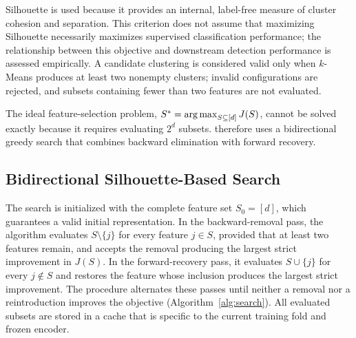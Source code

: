 Silhouette is used because it provides an internal, label-free measure of cluster cohesion and separation. This criterion does not assume that maximizing Silhouette necessarily maximizes supervised classification performance; the relationship between this objective and downstream detection performance is assessed empirically. A candidate clustering is considered valid only when $k$-Means produces at least two nonempty clusters; invalid configurations are rejected, and subsets containing fewer than two features are not evaluated.

The ideal feature-selection problem, $S^{*} = \operatorname*{arg\,max}_{S \subseteq [d]} J(S)$, cannot be solved exactly because it requires evaluating $2^{d}$ subsets. \method{} therefore uses a bidirectional greedy search that combines backward elimination with forward recovery.

\subsection{Bidirectional Silhouette-Based Search}
\label{sec:search}

The search is initialized with the complete feature set $S_0 = [d]$, which guarantees a valid initial representation. In the backward-removal pass, the algorithm evaluates $S \setminus \{j\}$ for every feature $j \in S$, provided that at least two features remain, and accepts the removal producing the largest strict improvement in $J(S)$. In the forward-recovery pass, it evaluates $S \cup \{j\}$ for every $j \notin S$ and restores the feature whose inclusion produces the largest strict improvement. The procedure alternates these passes until neither a removal nor a reintroduction improves the objective (Algorithm~\ref{alg:search}). All evaluated subsets are stored in a cache that is specific to the current training fold and frozen encoder.


